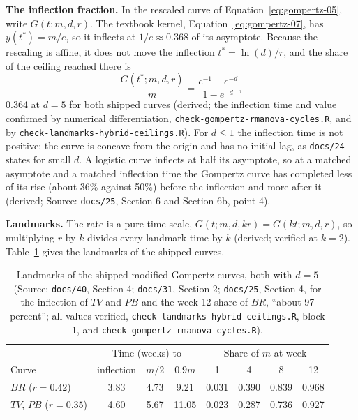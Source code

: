 \documentclass[11pt]{article}
\newcommand{\code}[1]{\texttt{#1}}
\begin{document}
\textbf{The inflection fraction.} In the rescaled curve of
Equation~\eqref{eq:gompertz-05}, write $G(t; m, d, r)$. The textbook
kernel, Equation~\eqref{eq:gompertz-07}, has $y(t^\ast) =
m/e$, so it inflects at $1/e \approx 0.368$ of its
asymptote. Because the rescaling is affine, it does not move the
inflection $t^\ast = \ln(d)/r$, and the share of the ceiling reached
there is
\begin{equation}
\frac{G(t^\ast; m, d, r)}{m} = \frac{e^{-1} - e^{-d}}{1 - e^{-d}},
\label{eq:invc-share-inflection}
\end{equation}
0.364 at $d = 5$ for both shipped curves (derived; the inflection time
and value confirmed by numerical differentiation,
\code{check-gompertz-rmanova-cycles.R}, and by \code{check-landmarks-hybrid-ceilings.R}). For $d \le 1$
the inflection time is not positive: the curve is concave from the
origin and has no initial lag, as \code{docs/24} states for small $d$.
A logistic curve inflects at half its asymptote, so at a matched
asymptote and a matched inflection time the Gompertz curve has
completed less of its rise (about 36\% against 50\%) before the
inflection and more after it (derived; Source: \code{docs/25},
Section 6 and Section 6b, point 4).

\textbf{Landmarks.} The rate is a pure time scale,
$G(t; m, d, k r) = G(k t; m, d, r)$, so multiplying $r$ by $k$ divides
every landmark time by $k$ (derived; verified at $k = 2$).
Table~\ref{tab:invc-landmarks} gives the landmarks of the shipped
curves.

\begin{table}[h]
\centering\small
\caption{Landmarks of the shipped modified-Gompertz curves, both with
$d = 5$ (Source: \code{docs/40}, Section 4; \code{docs/31}, Section 2;
\code{docs/25}, Section 4, for the inflection of $TV$ and $PB$ and the
week-12 share of $BR$, ``about 97 percent''; all values verified,
\code{check-landmarks-hybrid-ceilings.R}, block 1, and \code{check-gompertz-rmanova-cycles.R}).}
\label{tab:invc-landmarks}
\begin{tabular}{@{}lccccccc@{}}
\toprule
 & \multicolumn{3}{c}{Time (weeks) to} & \multicolumn{4}{c}{Share of $m$ at week} \\
Curve & inflection & $m/2$ & $0.9m$ & 1 & 4 & 8 & 12 \\
\midrule
$BR$ ($r = 0.42$) & 3.83 & 4.73 & 9.21 & 0.031 & 0.390 & 0.839 & 0.968 \\
$TV$, $PB$ ($r = 0.35$) & 4.60 & 5.67 & 11.05 & 0.023 & 0.287 & 0.736 & 0.927 \\
\bottomrule
\end{tabular}
\end{table}
\end{document}
